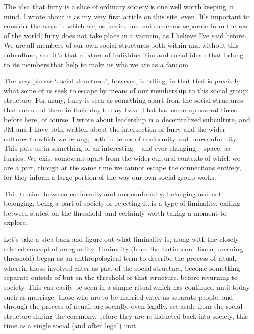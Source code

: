 
The idea that furry is a slice of ordinary society is one well worth keeping in mind. I wrote about it as my very first article on this site, even. It's important to consider the ways in which we, as furries, are not somehow separate from the rest of the world; furry does not take place in a vacuum, as I believe I've said before. We are all members of our own social structures both within and without this subculture, and it's that mixture of individualities and social ideals that belong to its members that help to make us who we are as a fandom

The very phrase `social structures', however, is telling, in that that is precisely what some of us seek to escape by means of our membership to this social group: structure. For many, furry is seen as something apart from the social structures that surround them in their day-to-day lives. That has come up several times before here, of course. I wrote about leadership in a decentralized subculture, and JM and I have both written about the intersection of furry and the wider cultures to which we belong, both in terms of conformity and non-conformity. This puts us in something of an interesting -- and ever-changing -- space, as furries. We exist somewhat apart from the wider cultural contexts of which we are a part, though at the same time we cannot escape the connections entirely, for they inform a large portion of the way our own social group works.

This tension between conformity and non-conformity, belonging and not belonging, being a part of society or rejecting it, is a type of liminality, exiting between states, on the threshold, and certainly worth taking a moment to explore.

Let's take a step back and figure out what liminality is, along with the closely related concept of marginality. Liminality (from the Latin word limen, meaning threshold) began as an anthropological term to describe the process of ritual, wherein those involved enter as part of the social structure, become something separate outside of but on the threshold of that structure, before returning to society. This can easily be seen in a simple ritual which has continued until today such as marriage: those who are to be married enter as separate people, and through the process of ritual, are socially, even legally, set aside from the social structure during the ceremony, before they are re-inducted back into society, this time as a single social (and often legal) unit.

